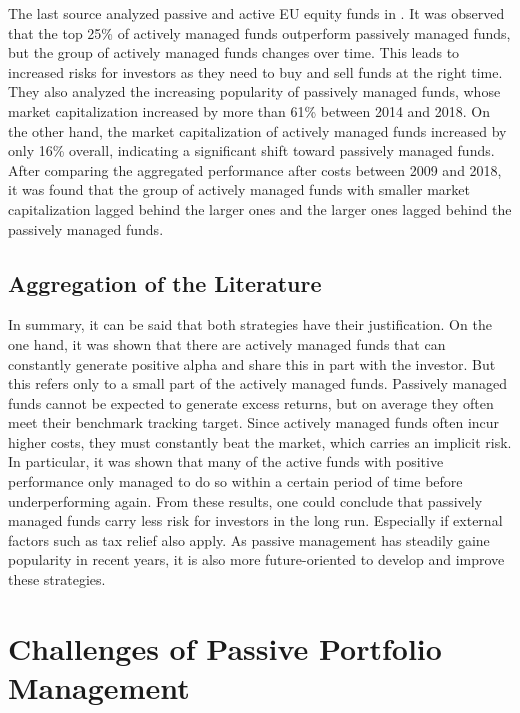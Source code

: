 \documentclass[
  oneside, a4paper, 12pt, openany]{book}
\theoremstyle{definition}
\theoremstyle{definition}
\theoremstyle{definition}
\theoremstyle{definition}
\theoremstyle{remark}
\begin{document}
The last source analyzed passive and active EU equity funds in \citep{TaDe2019}. It was observed that the top 25\% of actively managed funds outperform passively managed funds, but the group of actively managed funds changes over time. This leads to increased risks for investors as they need to buy and sell funds at the right time. They also analyzed the increasing popularity of passively managed funds, whose market capitalization increased by more than 61\% between 2014 and 2018. On the other hand, the market capitalization of actively managed funds increased by only 16\% overall, indicating a significant shift toward passively managed funds. After comparing the aggregated performance after costs between 2009 and 2018, it was found that the group of actively managed funds with smaller market capitalization lagged behind the larger ones and the larger ones lagged behind the passively managed funds.

\hypertarget{aggregation-of-the-literature}{%
\section{Aggregation of the Literature}\label{aggregation-of-the-literature}}

In summary, it can be said that both strategies have their justification. On the one hand, it was shown that there are actively managed funds that can constantly generate positive alpha and share this in part with the investor. But this refers only to a small part of the actively managed funds. Passively managed funds cannot be expected to generate excess returns, but on average they often meet their benchmark tracking target. Since actively managed funds often incur higher costs, they must constantly beat the market, which carries an implicit risk. In particular, it was shown that many of the active funds with positive performance only managed to do so within a certain period of time before underperforming again. From these results, one could conclude that passively managed funds carry less risk for investors in the long run. Especially if external factors such as tax relief also apply. As passive management has steadily gaine popularity in recent years, it is also more future-oriented to develop and improve these strategies.

\hypertarget{challenges}{%
\chapter{Challenges of Passive Portfolio Management}\label{challenges}}
\end{document}
